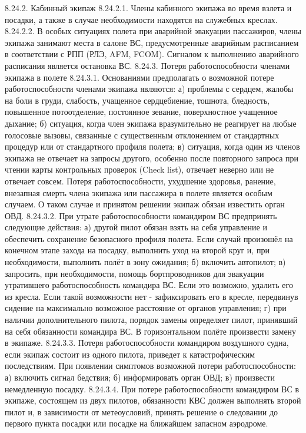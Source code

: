 8.24.2. Кабинный экипаж
8.24.2.1. Члены кабинного экипажа во время взлета и посадки, а также в случае необходимости находятся на служебных креслах.
8.24.2.2. В особых ситуациях полета при аварийной эвакуации пассажиров, члены экипажа занимают места в салоне ВС, предусмотренные аварийным расписанием в соответствии с РПП (РЛЭ, AFM, FCOM). Сигналом к выполнению аварийного расписания является остановка ВС.
8.24.3. Потеря работоспособности членами экипажа в полете
8.24.3.1. Основаниями предполагать о возможной потере работоспособности членами экипажа являются:
а)	проблемы с сердцем, жалобы на боли в груди, слабость, учащенное сердцебиение, тошнота, бледность, повышенное потоотделение, постоянное зевание, поверхностное учащенное дыхание;
б)	ситуация, когда член экипажа вразумительно не реагирует на любые голосовые вызовы, связанные с существенным отклонением от стандартных процедур или от стандартного профиля полета;
в)	ситуация, когда один из членов экипажа не отвечает на запросы другого, особенно после повторного запроса при чтении карты контрольных проверок (Check list), отвечает неверно или не отвечает совсем.
Потеря работоспособности, ухудшение здоровья, ранение, внезапная смерть члена экипажа или пассажира в полете является особым случаем. О таком случае и принятом решении экипаж обязан известить орган ОВД.
8.24.3.2. При утрате работоспособности командиром ВС предпринять следующие действия:
а)	другой пилот обязан взять на себя управление и обеспечить сохранение безопасного профиля полета. Если случай произошёл на конечном этапе захода на посадку, выполнить уход на второй круг и, при необходимости, выполнить полёт в зону ожидания;
б)	включить автопилот;
в)	запросить, при необходимости, помощь бортпроводников для эвакуации утратившего работоспособность командира ВС. Если это возможно, удалить его из кресла. Если такой возможности нет - зафиксировать его в кресле, передвинув сидение на максимально возможное расстояние от органов управления;
г)	при наличии дополнительного пилота, порядок замены определяет пилот, принявший на себя обязанности командира ВС. В горизонтальном полёте произвести замену в экипаже.
8.24.3.3. Потеря работоспособности командиром воздушного судна, если экипаж состоит из одного пилота, приведет к катастрофическим последствиям.
При появлении симптомов возможной потери работоспособности:
а)	включить сигнал бедствия;
б)	информировать орган ОВД;
в)	произвести немедленную посадку.
8.24.3.4. При потере работоспособности командиром ВС в экипаже, состоящем из двух пилотов, обязанности КВС должен выполнять второй пилот и, в зависимости от метеоусловий, принять решение о следовании до первого пункта посадки или посадке на ближайшем запасном аэродроме.
